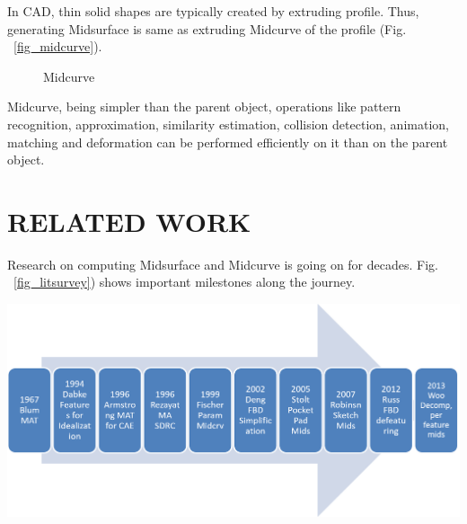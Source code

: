 \documentclass[9pt,academicons]{article}
\begin{document}
In CAD, thin solid shapes are typically created by extruding profile. Thus, generating Midsurface is same as extruding Midcurve of the profile (Fig. ~\ref{fig_midcurve}).

	\begin{figure} [!h]
		\centering
	 \quad
		\caption{Midcurve}
	\end{figure}
	
	
Midcurve, being simpler than the parent object, operations like pattern recognition, approximation, similarity estimation, collision detection, animation, matching and deformation can be performed efficiently on it than on the parent object. 



\section{RELATED WORK}

Research on computing Midsurface and Midcurve is going on for decades. Fig. ~\ref{fig_litsurvey}) shows important milestones along the journey.

    \begin{center}
	\includegraphics[width=\linewidth]{images/midcurve15}
	\label{fig_litsurvey}
    \end{center}
    
\end{document}
